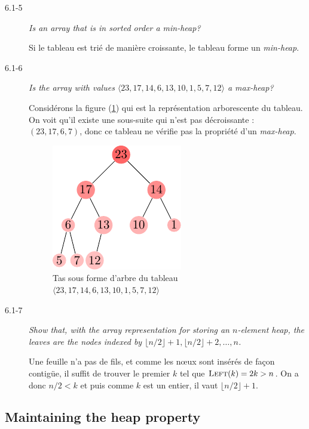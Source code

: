 \begin{description}
\begin{ex}
    \end{ex}
  \item[6.1-5] \textit{Is an array that is in sorted order a min-heap?}
    \begin{ex} %
      Si le tableau est tri\'e de mani\`ere croissante, le tableau forme un \textit{min-heap}.
    \end{ex}
  \item[6.1-6] \textit{Is the array with values $\langle 23, 17, 14, 6, 13, 10, 1, 5, 7, 12\rangle$ a max-heap?}
    \begin{ex}
      Consid\'erons la figure (\ref{fig:6.1-6}) qui est la repr\'esentation arborescente du tableau. On voit qu'il existe une sous-suite qui n'est pas d\'ecroissante : $(23, 17, 6, 7)$, donc ce tableau ne v\'erifie pas la propri\'et\'e d'un \textit{max-heap}.
        \begin{figure}[H]
          \centering
        \includegraphics[scale=1.5]{img/6_1-6/6_1-6.pdf}
        \caption{Tas sous forme d'arbre du tableau $\langle 23, 17, 14, 6, 13, 10, 1, 5, 7, 12\rangle$}
          \label{fig:6.1-6}
        \end{figure}
    \end{ex}
  \item[6.1-7] \textit{Show that, with the array representation for storing an $n$-element heap, the leaves are the nodes indexed by $\lfloor n/2 \rfloor +1, \lfloor n/2\rfloor + 2, \ldots, n$.}
    \begin{ex}
      Une feuille n'a pas de fils, et comme les n\oe ux sont ins\'er\'es de fa\c{c}on contig\"ue, il suffit de trouver le premier    $k$ tel que $\textsc{Left}(k) =2k > n$. On a donc $n/2 < k$ et puis comme $k$ est un entier, il vaut $\lfloor n/2 \rfloor +1$.
    \end{ex}
\end{description}

\subsection{Maintaining the heap property}

